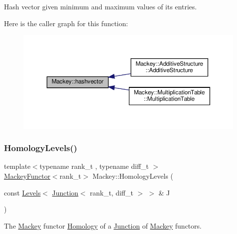 Hash vector given minimum and maximum values of its entries. 

Here is the caller graph for this function\+:\nopagebreak
\begin{figure}[H]
\begin{center}
\leavevmode
\includegraphics[width=350pt]{namespaceMackey_ae57418329a761aa68d26d68b637fe9dd_icgraph}
\end{center}
\end{figure}
\mbox{\label{namespaceMackey_a1c195484cc947abef84c726b534af5a5}} 
\subsubsection{\texorpdfstring{Homology\+Levels()}{HomologyLevels()}}
{\footnotesize\ttfamily template$<$typename rank\+\_\+t , typename diff\+\_\+t $>$ \\
\hyperlink{classMackey_1_1MackeyFunctor}{Mackey\+Functor}$<$rank\+\_\+t$>$ Mackey\+::\+Homology\+Levels (\begin{DoxyParamCaption}\item[{const \hyperlink{classMackey_1_1Levels}{Levels}$<$ \hyperlink{classMackey_1_1Junction}{Junction}$<$ rank\+\_\+t, diff\+\_\+t $>$ $>$ \&}]{J }\end{DoxyParamCaption})}



The \hyperlink{namespaceMackey}{Mackey} functor \hyperlink{classMackey_1_1Homology}{Homology} of a \hyperlink{classMackey_1_1Junction}{Junction} of \hyperlink{namespaceMackey}{Mackey} functors. 

